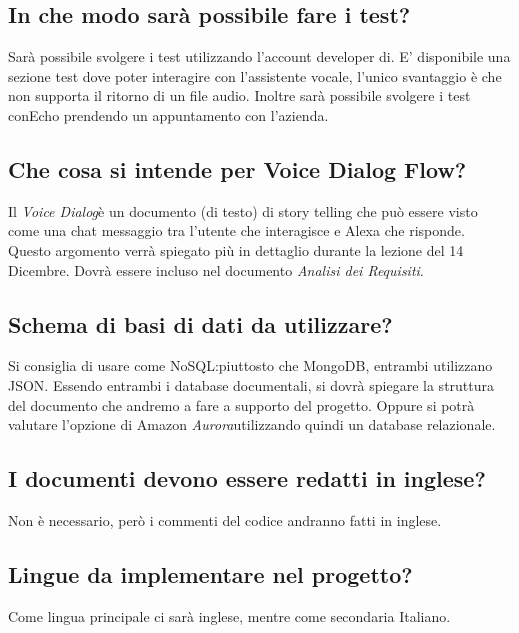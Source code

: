 \documentclass[a4paper,12pt]{article}
\begin{document}
	\subsection{In che modo sarà possibile fare i test?}
	Sarà possibile svolgere i test utilizzando l'account developer di. E' disponibile una sezione test dove poter interagire con l'assistente vocale, l'unico svantaggio è che non supporta il ritorno di un file audio. Inoltre sarà possibile svolgere i test conEcho prendendo un appuntamento con l'azienda.

	\subsection{Che cosa si intende per Voice Dialog Flow?}
	Il \textit{Voice Dialog}è un documento (di testo) di story telling che può essere visto come una chat messaggio tra l'utente che interagisce e Alexa che risponde. \\
	Questo argomento verrà spiegato più in dettaglio durante la lezione del 14 Dicembre. Dovrà essere incluso nel documento \textit{Analisi dei Requisiti}.
	
	\subsection{Schema di basi di dati da utilizzare?}
	Si consiglia di usare come NoSQL:piuttosto che MongoDB, entrambi utilizzano JSON. Essendo entrambi i database documentali, si dovrà spiegare la struttura del documento che andremo a fare a supporto del progetto. Oppure si potrà valutare l'opzione di Amazon \textit{Aurora}utilizzando quindi un database relazionale.
	
	\subsection{I documenti devono essere redatti in inglese?}
	Non è necessario, però i commenti del codice andranno fatti in inglese.
	
	\subsection{Lingue da implementare nel progetto?}
	Come lingua principale ci sarà inglese, mentre come secondaria Italiano.
	
\end{document}
